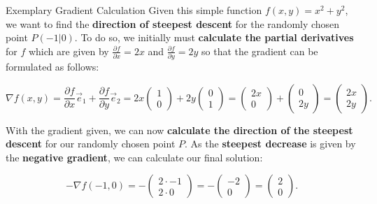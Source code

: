\documentclass[main.tex]{subfiles}
\begin{document}
    \begin{frame}{Exemplary Gradient Calculation}
        Given this simple function $f(x, y) = x^2 + y^2$, we want to find the \textbf{direction of steepest descent} for the randomly chosen point $P(-1|0)$. To do so, we initially must \textbf{calculate the partial derivatives} for $f$ which are given by $\frac{\partial f}{\partial x} = 2x$ and $\frac{\partial f}{\partial y} = 2y$ so that the gradient can be formulated as follows:
        
        $$\nabla f(x, y) = \frac{\partial f}{\partial x} \vec{e}_1 + \frac{\partial f}{\partial y} \vec{e}_2 =  2x \begin{pmatrix} 1 \\ 0\end{pmatrix} + 2y \begin{pmatrix} 0 \\ 1\end{pmatrix} = \begin{pmatrix} 2x \\ 0\end{pmatrix} + \begin{pmatrix} 0 \\ 2y \end{pmatrix} = \begin{pmatrix}2x \\ 2y \end{pmatrix}.$$
        
        With the gradient given, we can now \textbf{calculate the direction of the steepest descent} for our randomly chosen point $P$. As the \textbf{steepest decrease} is given by the \textbf{negative gradient}, we can calculate our final solution:
        
        $$-\nabla f(-1, 0) = -\begin{pmatrix}2 \cdot -1 \\ 2 \cdot 0 \end{pmatrix} = -\begin{pmatrix} -2 \\ 0 \end{pmatrix} = \begin{pmatrix} 2 \\ 0 \end{pmatrix}.$$
        
        \vspace*{-5mm}
    \end{frame}
\end{document}
